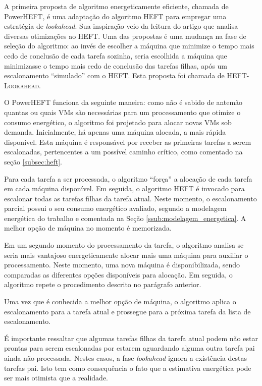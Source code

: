 A primeira proposta de algoritmo energeticamente eficiente, chamada de
PowerHEFT, é uma adaptação do algoritmo HEFT para empregar uma estratégia de
\emph{lookahead}. Sua inspiração veio da leitura do artigo
\cite{bittencourt:heft_lookahead} que analisa diversas otimizações ao HEFT. Uma
das propostas é uma mudança na fase de seleção do algoritmo: ao invés de
escolher a máquina que minimize o tempo mais cedo de conclusão de cada tarefa
sozinha, seria escolhida a máquina que minimizasse o tempo mais cedo de
conclusão das tarefas filhas, após um escalonamento ``simulado'' com o HEFT.
Esta proposta foi chamada de \textsc{HEFT-Lookahead}.

O PowerHEFT funciona da seguinte maneira: como não é sabido de antemão quantas
ou quais VMs são necessárias para um processamento que otimize o consumo
energético, o algoritmo foi projetado para alocar novas VMs sob demanda.
Inicialmente, há apenas uma máquina alocada, a mais rápida disponível. Esta
máquina é responsável por receber as primeiras tarefas a serem escalonadas,
pertencentes a um possível caminho crítico, como comentado na seção
\ref{subsec:heft}.

Para cada tarefa a ser processada, o algoritmo ``força'' a alocação de cada
tarefa em cada máquina disponível. Em seguida, o algoritmo HEFT é invocado para
escalonar todas as tarefas filhas da tarefa atual. Neste momento, o
escalonamento parcial possui o seu consumo energético avaliado, segundo a
modelagem energética do trabalho \cite{guerout:energy_aware_simulation} e
comentada na Seção \ref{ssub:modelagem_energetica}. A melhor opção de máquina no
momento é memorizada.

Em um segundo momento do processamento da tarefa, o algoritmo analisa se seria
mais vantajoso energeticamente alocar mais uma máquina para auxiliar o
processamento. Neste momento, uma nova máquina é disponibilizada, sendo
comparadas as diferentes opções disponíveis para alocação. Em seguida, o
algoritmo repete o procedimento descrito no parágrafo anterior.

Uma vez que é conhecida a melhor opção de máquina, o algoritmo aplica o
escalonamento para a tarefa atual e prossegue para a próxima tarefa da lista de
escalonamento.

É importante ressaltar que algumas tarefas filhas da tarefa atual podem não
estar prontas para serem escalonadas por estarem aguardando alguma outra
tarefa pai ainda não processada. Nestes casos, a fase \emph{lookahead} ignora
a existência destas tarefas pai. Isto tem como consequência o fato que a
estimativa energética pode ser mais otimista que a realidade.

